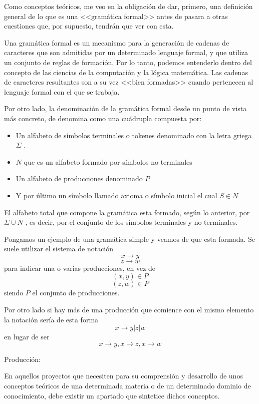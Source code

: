
Como conceptos teóricos, me veo en la obligación de dar, primero, una definición general de lo que es una <<gramática formal>> antes de pasara a otras cuestiones que, por supuesto, tendrán que ver con esta.

Una gramática formal es un mecanismo para la generación de cadenas de caracteres que son admitidas por un determinado lenguaje formal, y que utiliza un conjunto de reglas de formación. Por lo tanto, podemos entenderlo dentro del concepto de las ciencias de la computación y la lógica matemática. Las cadenas de caracteres resultantes son a su vez <<bien formadas>> cuando pertenecen al lenguaje formal con el que se trabaja.

Por otro lado, la denominación de la gramática formal desde un punto de vista más concreto, de denomina como una cuádrupla compuesta por:

\begin{itemize}
	\item Un alfabeto de símbolos terminales o tokenes denominado con la letra griega $\Sigma$ .
	\item  $N$ que es un alfabeto formado por símbolos no terminales
	\item Un alfabeto de producciones denominado $P$
	\item Y por último un símbolo llamado axioma o símbolo inicial el cual $S \in N$
\end{itemize}

El alfabeto total que compone la gramática esta formado, según lo anterior, por $\Sigma \cup N$ , es decir, por el conjunto de los símbolos terminales y no terminales.

Pongamos un ejemplo de una gramática simple y veamos de que esta formada. Se suele utilizar el sistema de notación  \[x \rightarrow y\] \[z \rightarrow w\] para indicar una o varias producciones, en vez de \[(x, y) \in P \] \[(z, w) \in P \] siendo $P$ el conjunto de producciones.

Por otro lado si hay más de una producción que comience con el mismo elemento la notación sería de esta forma \[ x \rightarrow y | z | w\] en lugar de ser \[ x \rightarrow y, x \rightarrow z, x \rightarrow w\]


Producción: 

En aquellos proyectos que necesiten para su comprensión y desarrollo de unos conceptos teóricos de una determinada materia o de un determinado dominio de conocimiento, debe existir un apartado que sintetice dichos conceptos.

